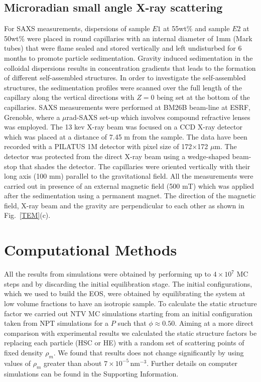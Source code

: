 \documentclass[aps,prl,preprint,superscriptaddress]{revtex4-1} %
\def\nm{\,\si{\nano\meter}}%
\begin{document}
\subsection{Microradian small angle X-ray scattering}
For SAXS measurements, dispersions of sample $E1$ at 55wt\% and sample $E2$ at 50wt\% were placed in round capillaries with an internal diameter of 1mm (Mark tubes) that were flame sealed and stored vertically and left undisturbed for 6 months to promote particle sedimentation. Gravity induced sedimentation in the colloidal dispersions results in concentration gradients that leads to the formation of different self-assembled structures. In order to investigate the self-assembled structures, the sedimentation profiles were scanned over the full length of the capillary along the vertical directions with $Z=0$ being set at the bottom of the capillaries. SAXS measurements were performed at BM26B beam-line at ESRF, Grenoble, where a $\mu$rad-SAXS set-up which involves compound refractive lenses~\cite{petukhov2015particle} was employed. The 13 kev X-ray beam was focused on a CCD X-ray detector which was placed at a distance of 7.45 m from the sample. The data have been recorded with a PILATUS 1M detector with pixel size of 172$\times$172 $\mu$m. The detector was protected from the direct X-ray beam using a wedge-shaped beam-stop that shades the detector. The capillaries were oriented vertically with their long axis (100 mm) parallel to the gravitational field. All the measurements were carried out in presence of an external magnetic field (500 mT) which was applied after the sedimentation using a permanent magnet. The direction of the magnetic field, X-ray beam and the gravity are perpendicular to each other as shown in Fig.~\ref{TEM}(c).
\section{Computational Methods}
All the results from simulations were obtained by performing up to $4\times10^7$ MC steps and by discarding the initial equilibration stage.
The initial configurations, which we used to build the EOS, were obtained by equilibrating the system at low volume fractions to have an isotropic
sample. To calculate the static structure factor we carried out NTV MC simulations starting from an initial configuration taken 
from NPT simulations for a $P$ such that $\phi\approx 0.50$. Aiming at a more direct comparison with experimental results we calculated
the static structure factors be replacing each particle (HSC or HE) with a random set of scattering points of fixed density $\rho_m$. We found
that results does not change significantly by using values of $\rho_m$ greater than about $7\times 10^{-5} \nm^{-3}$.%
Further details on computer simulations can be found in the Supporting Information.
\end{document}
